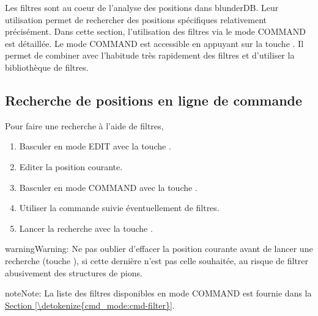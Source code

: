 \documentclass[letterpaper,10pt,english]{sphinxmanual}
\begin{document}
\sphinxAtStartPar
Les filtres sont au coeur de l’analyse des positions dans blunderDB.
Leur utilisation permet de rechercher des positions spécifiques relativement
précisément. Dans cette section, l’utilisation des filtres via le mode COMMAND
est détaillée. Le mode COMMAND est accessible en appuyant sur la touche .
Il permet de combiner avec l’habitude très rapidement des filtres et d’utiliser
la bibliothèque de filtres.


\subsection{Recherche de positions en ligne de commande}
\label{\detokenize{annexe_filtres:recherche-de-positions-en-ligne-de-commande}}
\sphinxAtStartPar
Pour faire une recherche à l’aide de filtres,
\begin{enumerate}
%
\item {} 
\sphinxAtStartPar
Basculer en mode EDIT avec la touche .

\item {} 
\sphinxAtStartPar
Editer la position courante.

\item {} 
\sphinxAtStartPar
Basculer en mode COMMAND avec la touche .

\item {} 
\sphinxAtStartPar
Utiliser la commande  suivie éventuellement de filtres.

\item {} 
\sphinxAtStartPar
Lancer la recherche avec la touche .

\end{enumerate}

\begin{sphinxadmonition}{warning}{Warning:}
\sphinxAtStartPar
Ne pas oublier d’effacer la position courante avant de lancer une recherche
(touche ), si cette dernière n’est pas celle souhaitée, au
risque de filtrer abusivement des structures de pions.
\end{sphinxadmonition}

\begin{sphinxadmonition}{note}{Note:}
\sphinxAtStartPar
La liste des filtres disponibles en mode COMMAND est fournie dans la
\hyperref[\detokenize{cmd_mode:cmd-filter}]{Section \ref{\detokenize{cmd_mode:cmd-filter}}}.
\end{sphinxadmonition}
\end{document}
